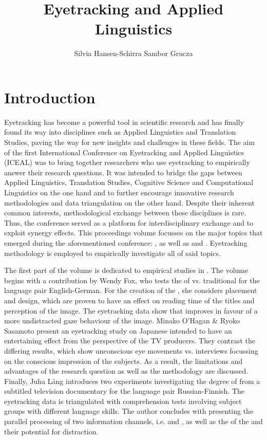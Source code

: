 \documentclass[output=paper]{langsci/langscibook}
\author{%
Silvia Hansen-Schirra\affiliation{Johannes Gutenberg University of Mainz in Germersheim}%
\lastand
Sambor Grucza \affiliation{University of Warsaw}
}
\title{Eyetracking and Applied Linguistics}
\begin{document}
\section{Introduction}

Eyetracking has become a powerful tool in scientific research and has finally found its way into disciplines such as Applied Linguistics and Translation Studies, paving the way for new insights and challenges in these fields. The aim of the first International Conference on Eyetracking and Applied Linguistics (ICEAL) was to bring together researchers who use eyetracking to empirically answer their research questions. It was intended to bridge the gaps between Applied Linguistics, Translation Studies, Cognitive Science and Computational Linguistics on the one hand and to further encourage innovative research methodologies and data triangulation on the other hand. Despite their inherent common interests, methodological exchange between these disciplines is rare. Thus, the conference served as a platform for interdisciplinary exchange and to exploit synergy effects. This proceedings volume focusses on the major topics that emerged during the aforementioned conference: ,  as well as  and . Eyetracking methodology is employed to empirically investigate all of said topics. 

The first part of the volume is dedicated to empirical studies in . The volume begins with a contribution by Wendy Fox, who tests the  of  vs. traditional  for the language pair English-German. For the creation of the , she considers placement and design, which are proven to have an effect on reading time of the titles and perception of the image. The eyetracking data show that  improves in favour of a more undistracted gaze behaviour of the image. Minako O’Hagan \& Ryoko Sasamoto present an eyetracking study on Japanese  intended to have an entertaining effect from the perspective of the TV producers. They contrast the differing results, which show unconscious eye movements vs. interviews focussing on the conscious impression of the subjects. As a result, the limitations and advantages of the research question as well as the methodology are discussed. Finally, Juha Lång introduces two experiments investigating the degree of  from a subtitled television documentary for the language pair Russian-Finnish. The eyetracking data is triangulated with comprehension tests involving subject groups with different language skills. The author concludes with presenting the parallel processing of two information channels, i.e.  and , as well as the  of the  and their potential for distraction.
\end{document}
